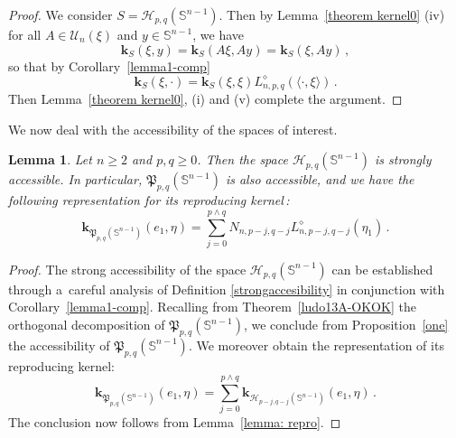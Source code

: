 \documentclass[12pt]{amsart}
\numberwithin{subsection}{section}
\newtheorem{lemma}[theorem]{Lemma}
\theoremstyle{definition}
\theoremstyle{remark}
\begin{document}
 \begin{proof}
 We consider  $S = \mathcal{H}_{p,q}(\mathbb{S}^{n-1}) $. Then by Lemma~\ref{theorem kernel0} (iv)  for all $A \in \mathcal{U}_n(\xi)$
 and  $y \in \mathbb{S}^{n-1} $,  we have
   \begin{equation*}
     \mathbf{k}_S(\xi, y) = \mathbf{k}_S(A\xi, Ay) = \mathbf{k}_S(\xi, Ay)\,,
   \end{equation*}
   so that by Corollary~\ref{lemma1-comp}
   \begin{equation*}
     \mathbf{k}_S(\xi, \cdot) = \mathbf{k}_S(\xi, \xi) L^{\diamond}_{n,p,q}(\langle\pmb{\cdot},\xi\rangle)\,.
   \end{equation*}
   Then Lemma~\ref{theorem kernel0}, (i) and (v) complete the argument.
 \end{proof}




We now deal with the accessibility of the spaces of interest.

\begin{lemma}    \label{accessibility-comp}
Let $n \geq 2$ and $p, q \geq 0$. Then the space $\mathcal{H}_{p,q}(\mathbb{S}^{n-1})$ is strongly accessible. In particular,
$\mathfrak{P}_{p,q}(\mathbb{S}^{n-1})$ is also accessible, and we have the following representation for its reproducing kernel\,:
\[
\mathbf{k}_{\mathfrak{P}_{p,q}(\mathbb{S}^{n-1})}(e_1,\eta) = \sum_{j=0}^{p \wedge q} N_{n,p-j,q-j} L^{\diamond}_{n,p-j, q-j}(\eta_1)\,.
\]
\end{lemma}


\begin{proof}
The strong accessibility of the space $\mathcal{H}_{p,q}(\mathbb{S}^{n-1})$ can be established through a~careful analysis of Definition
\ref{strongaccesibility} in conjunction with Corollary~\ref{lemma1-comp}. Recalling from Theorem~\ref{ludo13A-OKOK} the orthogonal
decomposition of $\mathfrak{P}_{p,q}(\mathbb{S}^{n-1})$, we conclude from Proposition~\ref{one} the accessibility of
$\mathfrak{P}_{p,q}(\mathbb{S}^{n-1})$. We moreover obtain  the representation of its reproducing kernel:
\[
\mathbf{k}_{\mathfrak{P}_{p,q}(\mathbb{S}^{n-1})}(e_1,\eta) = \sum_{j=0}^{p \wedge q} \mathbf{k}_{\mathcal{H}_{p-j, q-j}(\mathbb{S}^{n-1})}(e_1,\eta)\,.
\]
The conclusion now follows from Lemma~\ref{lemma: repro}.
\end{proof}
\end{document}
